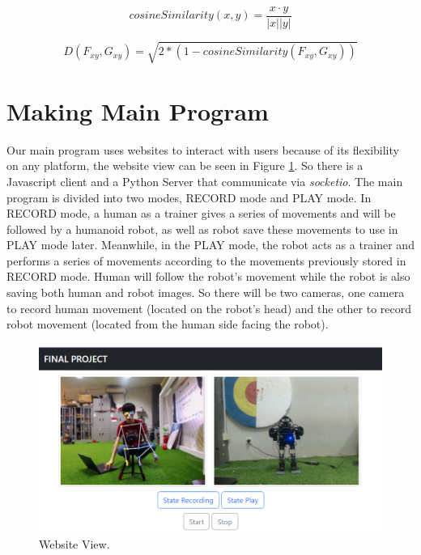 \begin{equation}
  \label{eq:cosinesimilarity}
  cosineSimilarity(x,y) = \frac{x \cdot y}{|x||y|}
\end{equation}

\begin{equation}
  \label{eq:euclideandistance}
  D(F_{xy}, G_{xy}) = \sqrt{2 * (1 - cosineSimilarity(F_{xy}, G_{xy}))}
\end{equation}



\section{Making Main Program}
\label{sec:makingmainprogram}

Our main program uses websites to interact with users because of its flexibility on any platform, the website view can be seen in Figure \ref{fig:websiteview}. So there is a Javascript client and a Python Server that communicate via \emph{socketio}.
The main program is divided into two modes, RECORD mode and PLAY mode. In RECORD mode, a human as a trainer gives a series of movements and will be followed by a humanoid robot, as well as robot save these movements to use in PLAY mode later.
Meanwhile, in the PLAY mode, the robot acts as a trainer and performs a series of movements according to the movements previously stored in RECORD mode. Human will follow the robot's movement while the robot is also saving both human and robot images.
So there will be two cameras, one camera to record human movement (located on the robot's head) and the other to record robot movement (located from the human side facing the robot).
\begin{figure}[ht]
  \centering
  \includegraphics[scale=0.75]{gambar/web.png}
  \caption{Website View.}
  \label{fig:websiteview}
\end{figure}


